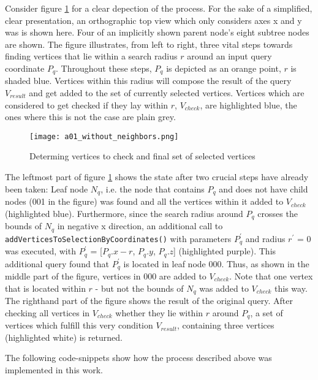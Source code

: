 Consider figure \ref{fig:a01_without_neighbours} for a clear depection of the process. For the sake of a simplified, clear presentation, an orthographic top view which only considers axes x and y was is shown here. Four of an implicitly shown parent node's eight subtree nodes are shown. The figure illustrates, from left to right, three vital steps towards finding vertices that lie within a search radius $r$ around an input query coordinate $P_q$. Throughout these steps, $P_q$ is depicted as an orange point, $r$ is shaded blue. Vertices within this radius will compose the result of the query $V_{result}$ and get added to the set of currently selected vertices. Vertices which are considered to get checked if they lay within $r$, $V_{check}$, are highlighted blue, the ones where this is not the case are plain grey.

\begin{figure}[htb]
  \centering
  \texttt{[image: a01\_without\_neighbors.png]}
  \caption{Determing vertices to check and final set of selected vertices}\label{fig:a01_without_neighbours}
\end{figure}

The leftmost part of figure \ref{fig:a01_without_neighbours} shows the state after two crucial steps have already been taken: Leaf node $N_q$, i.e. the node that contains $P_q$ and does not have child nodes (001 in the figure) was found and all the vertices within it added to $V_{check}$ (highlighted blue). Furthermore, since the search radius around $P_q$ crosses the bounds of $N_q$ in negative x direction, an additional call to \texttt{addVerticesToSelectionByCoordinates()} with parameters $P_{q}^{'}$ and radius $r^{'}$ = 0 was executed, with $P_{q}^{'}$ = [$P_q.x-r$, $P_q.y$, $P_q.z$] (highlighted purple). This additional query found that $P_{q}^{'}$ is located in leaf node 000. Thus, as shown in the middle part of the figure, vertices in 000 are added to $V_{check}$. Note that one vertex that is located within $r$ - but not the bounds of $N_q$ was added to $V_{check}$ this way. The righthand part of the figure shows the result of the original query. After checking all vertices in $V_{check}$ whether they lie within $r$ around $P_q$, a set of vertices which fulfill this very condition $V_{result}$, containing three vertices (highlighted white) is returned.

The following code-snippets show how the process described above was implemented in this work.

